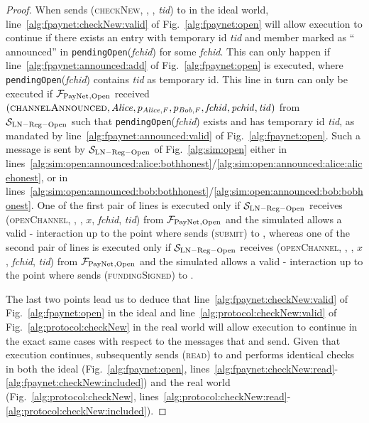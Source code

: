 \begin{proof}
    When \environment{} sends (\textsc{checkNew}, \alice, \bob, \textit{tid}) to
    \alice{} in the ideal world, line~\ref{alg:fpaynet:checkNew:valid} of
    Fig.~\ref{alg:fpaynet:open} will allow execution to continue if there exists
    an entry with temporary id \textit{tid} and member \alice{} marked as
    ``\alice{} announced'' in \texttt{pendingOpen}(\textit{fchid}) for some
    \textit{fchid}. This can only happen if line~\ref{alg:fpaynet:announced:add}
    of Fig.~\ref{alg:fpaynet:open} is executed, where
    \texttt{pendingOpen}(\textit{fchid}) contains \textit{tid} as temporary id.
    This line in turn can only be executed if $\mathcal{F}_{\mathrm{PayNet}}{}_{\mathrm{, Open}}$
    received $\left(\textsc{channelAnnounced}, \mathit{Alice}, p_{\mathit{Alice}, F}, p_{\mathit{Bob},
    F}, \mathit{fchid}, \mathit{pchid}, \mathit{tid}\right)$ from
    $\mathcal{S}_{\mathrm{LN - Reg - Open}}$ such that
    \texttt{pendingOpen}(\textit{fchid}) exists and has temporary id
    \textit{tid}, as mandated by line~\ref{alg:fpaynet:announced:valid} of
    Fig.~\ref{alg:fpaynet:open}. Such a message is sent by
    $\mathcal{S}_{\mathrm{LN - Reg - Open}}$ of Fig.~\ref{alg:sim:open} either in
    lines~\ref{alg:sim:open:announced:alice:bothhonest}/\ref{alg:sim:open:announced:alice:alicehonest},
    or in
    lines~\ref{alg:sim:open:announced:bob:bothhonest}/\ref{alg:sim:open:announced:bob:bobhonest}.
    One of the first pair of lines is executed only if $\mathcal{S}_{\mathrm{LN -
    Reg - Open}}$ receives (\textsc{openChannel}, \alice, \bob, $x$,
    \textit{fchid}, \textit{tid}) from $\mathcal{F}_{\mathrm{PayNet}}{}_{\mathrm{, Open}}$ and the
    simulated \adversary{} allows a valid \alice-\bob{} interaction up to the
    point where \alice{} sends (\textsc{submit}) to \ledger, whereas one of the
    second pair of lines is executed only if $\mathcal{S}_{\mathrm{LN - Reg -
    Open}}$ receives (\textsc{openChannel}, \bob, \alice, $x$, \textit{fchid},
    \textit{tid}) from $\mathcal{F}_{\mathrm{PayNet}}{}_{\mathrm{, Open}}$ and the simulated
    \adversary{} allows a valid \alice-\bob{} interaction up to the point where
    \alice{} sends (\textsc{fundingSigned}) to \bob.

    The last two points lead us to deduce that
    line~\ref{alg:fpaynet:checkNew:valid} of Fig.~\ref{alg:fpaynet:open} in the
    ideal and line~\ref{alg:protocol:checkNew:valid} of
    Fig.~\ref{alg:protocol:checkNew} in the real world will allow execution to
    continue in the exact same cases with respect to the messages that
    \environment{} and \adversary{} send. Given that execution continues,
    \alice{} subsequently sends (\textsc{read}) to \ledger{} and performs
    identical checks in both the ideal (Fig.~\ref{alg:fpaynet:open},
    lines~\ref{alg:fpaynet:checkNew:read}-\ref{alg:fpaynet:checkNew:included})
    and the real world (Fig.~\ref{alg:protocol:checkNew},
    lines~\ref{alg:protocol:checkNew:read}-\ref{alg:protocol:checkNew:included}).


\end{proof}
